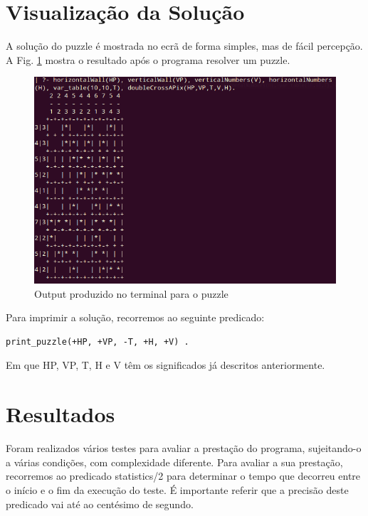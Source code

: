 \documentclass[runningheads,a4paper]{llncs}
\begin{document}
\section{Visualização da Solução}

A solução do puzzle é mostrada no ecrã de forma simples, mas de fácil percepção. A Fig. \ref{fig:outputboard} mostra o resultado após o programa resolver um puzzle.

\begin{figure}[h]
\centering
\includegraphics[scale=0.5]{res/output.png}
\caption{Output produzido no terminal para o puzzle}
\label{fig:outputboard}
\end{figure}

Para imprimir a solução, recorremos ao seguinte predicado:

\begin{lstlisting}
print_puzzle(+HP, +VP, -T, +H, +V) .
\end{lstlisting}

Em que HP, VP, T, H e V têm os significados já descritos anteriormente.

\section{Resultados}

Foram realizados vários testes para avaliar a prestação do programa, sujeitando-o a várias condições, com complexidade diferente. Para avaliar a sua prestação, recorremos ao predicado statistics/2 para determinar o tempo que decorreu entre o início e o fim da execução do teste. É importante referir que a precisão deste predicado vai até ao centésimo de segundo.
\end{document}
